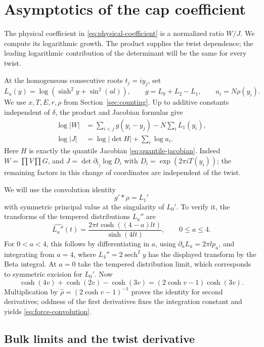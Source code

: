\section{Asymptotics of the cap coefficient}\label{sec:asymptotics}

The physical coefficient in \eqref{eq:physical-coefficient} is a normalized ratio \(W/J\). We compute its logarithmic growth. The product supplies the twist dependence; the leading logarithmic contribution of the determinant will be the same for every twist.

At the homogeneous consecutive roots \(t_j=iy_j\), set
\[
 L_a(y)=\log(\sinh^2y+\sin^2(al)),\qquad g=L_0+L_2-L_1,
 \qquad a_i=N\rho(y_i).
\]
We use \(x,T,E,r,\rho\) from Section~\ref{sec:counting}. Up to additive constants independent of \(\delta\), the product and Jacobian formulas give
\[
 \begin{aligned}
 \log|W|&=\sum_{i<j}g(y_i-y_j)-N\sum_iL_1(y_i),\\
 \log|J|&=\log|\det H|+\sum_i\log a_i.
 \end{aligned}
\]
Here \(H\) is exactly the quantile Jacobian \eqref{eq:quantile-jacobian}. Indeed \(W=\prod V\prod G\), and
\(J=\det\partial_{t_j}\log D_i\) with
\(D_i=\exp(2\pi iT(y_i))\); the remaining factors in this change of coordinates are independent of the twist.

We will use the convolution identity
\begin{equation}\label{eq:force-convolution}
 g'*\rho=L_1'
\end{equation}
with symmetric principal value at the singularity of \(L_0'\).
To verify it, the transforms of the tempered distributions \(L_a''\) are
\[
 \widehat{L_a''}(t)
 =\frac{2\pi t\cosh((4-a)lt)}{\sinh(4lt)},\qquad 0\le a\le4.
\]
For \(0<a<4\), this follows by differentiating in \(a\), using
\(\partial_aL_a=2\pi l p_a\), and integrating from \(a=4\), where
\(L_4''=2\operatorname{sech}^2y\) has the displayed transform by the Beta integral. At \(a=0\) take the tempered distribution limit, which corresponds to symmetric excision for \(L_0'\).
Now
\[
 \cosh(4v)+\cosh(2v)-\cosh(3v)
 =(2\cosh v-1)\cosh(3v).
\]
Multiplication by \(\widehat\rho=(2\cosh v-1)^{-1}\) proves the identity for second derivatives; oddness of the first derivatives fixes the integration constant and yields \eqref{eq:force-convolution}.

\subsection{Bulk limits and the twist derivative}

